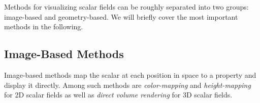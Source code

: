 %
%
Methods for visualizing scalar fields can be roughly separated into two groups:
image-based and geometry-based.
%
We will briefly cover the most important methods in the following.
%
%

\subsection{Image-Based Methods} %
\label{sub:scalar_image_based}
%
Image-based methods map the scalar at each position in space to a property and
display it directly.
%
Among such methods are \emph{color-mapping} and \emph{height-mapping} for
\ac{2D} scalar fields as well as \emph{direct volume rendering} for \ac{3D}
scalar fields.
%

%
